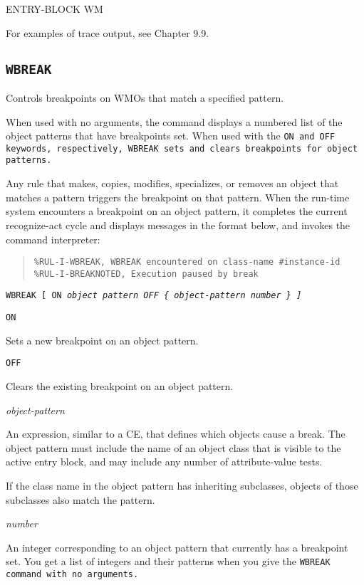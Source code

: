 {{ENTRY-BLOCK WM

For examples of trace output, see Chapter 9.9.

\subsection{\tt{WBREAK}}

Controls breakpoints on WMOs that match a specified pattern.

When used with no arguments, the command displays a numbered
list of the object patterns that have breakpoints set. When
used with the \tt{ON} and \tt{OFF} keywords, respectively, \tt{WBREAK} sets
and clears breakpoints for object patterns.

Any rule that makes, copies, modifies, specializes, or
removes an object that matches a pattern triggers the
breakpoint on that pattern. When the run-time system
encounters a breakpoint on an object pattern, it completes
the current recognize-act cycle and displays messages in the
format below, and invokes the command interpreter:
\begin{quote}
\begin{verbatim}
%RUL-I-WBREAK, WBREAK encountered on class-name #instance-id
%RUL-I-BREAKNOTED, Execution paused by break
\end{verbatim}
\end{quote}

\Format

\tt{WBREAK} [ \tt{ON} \it{object pattern} \tt{OFF} \{ \it{object-pattern} \it{number} \tt* \} ]

\Arguments

\tt{ON}

Sets a new breakpoint on an object pattern.

\tt{OFF}

Clears the existing breakpoint on an object pattern.

\it{object-pattern}

An expression, similar to a CE, that defines which objects
cause a break. The object pattern must include the name of an
object class that is visible to the active entry block, and
may include any number of attribute-value tests.

If the class name in the object pattern has inheriting
subclasses, objects of those subclasses also match the
pattern.

\it{number}

An integer corresponding to an object pattern that currently
has a breakpoint set. You get a list of integers and their
patterns when you give the \tt{WBREAK} command with no arguments.

}}
